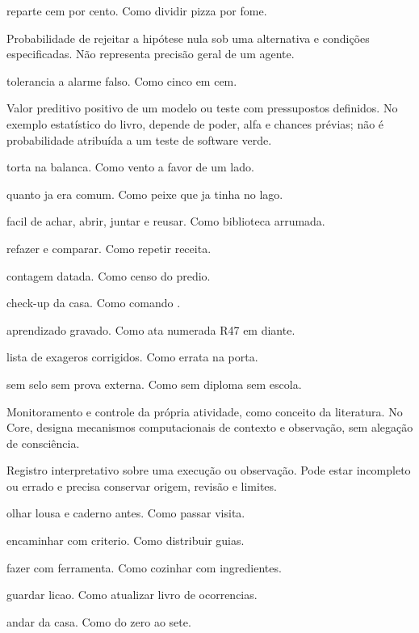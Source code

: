 \begin{descricao}
\begin{description}[style=nextline,leftmargin=1.3em,itemsep=5pt]
\item[Softmax.] reparte cem por cento. Como dividir pizza por fome.
\item[Poder.] Probabilidade de rejeitar a hipótese nula sob uma alternativa e condições especificadas. Não representa precisão geral de um agente.
\item[Alfa.] tolerancia a alarme falso. Como cinco em cem.
\item[PPV.] Valor preditivo positivo de um modelo ou teste com pressupostos definidos. No exemplo estatístico do livro, depende de poder, alfa e chances prévias; não é probabilidade atribuída a um teste de software verde.
\item[Viés.] torta na balanca. Como vento a favor de um lado.
\item[Taxa-base.] quanto ja era comum. Como peixe que ja tinha no lago.
\item[FAIR.] facil de achar, abrir, juntar e reusar. Como biblioteca arrumada.
\item[Reprodução.] refazer e comparar. Como repetir receita.
\item[Fotografia.] contagem datada. Como censo do predio.
\item[Doctor.] check-up da casa. Como comando .
\item[Ciclo de evolucao.] aprendizado gravado. Como ata numerada R47 em diante.
\item[Corrigendum.] lista de exageros corrigidos. Como errata na porta.
\item[Anti-overclaim.] sem selo sem prova externa. Como sem diploma sem escola.
\item[Metacognição.] Monitoramento e controle da própria atividade, como conceito da literatura. No Core, designa mecanismos computacionais de contexto e observação, sem alegação de consciência.
\item[Reflexão.] Registro interpretativo sobre uma execução ou observação. Pode estar incompleto ou errado e precisa conservar origem, revisão e limites.
\item[Percebe.] olhar lousa e caderno antes. Como passar visita.
\item[Delega.] encaminhar com criterio. Como distribuir guias.
\item[Executa.] fazer com ferramenta. Como cozinhar com ingredientes.
\item[Reflete.] guardar licao. Como atualizar livro de ocorrencias.
\item[Camada.] andar da casa. Como do zero ao sete.

\end{description}
\end{descricao}
